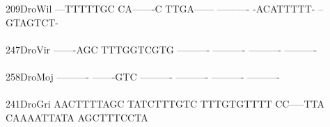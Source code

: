 \documentclass[11pt,twoside,reqno,a4paper]{article}
\begin{document}
{209\hspace*{1\charwidth}DroWil	---TTTTTGC	CA-------C	TTGA------	----------	-ACATTTTT-	--GTAGTCT-	\\
\hspace*{4\charwidth}\hspace*{7\charwidth}\hspace*{1\charwidth}\hspace*{1\charwidth}\hspace*{1\charwidth}\hspace*{1\charwidth}\hspace*{1\charwidth}\hspace*{1\charwidth}\\
247\hspace*{1\charwidth}DroVir	-------AGC	TTTGGTCGTG	----------	----------	----------	----------	\\
\hspace*{4\charwidth}\hspace*{7\charwidth}\hspace*{1\charwidth}\hspace*{1\charwidth}\hspace*{1\charwidth}\hspace*{1\charwidth}\hspace*{1\charwidth}\hspace*{1\charwidth}\\
258\hspace*{1\charwidth}DroMoj	----------	-------GTC	----------	----------	----------	----------	\\
\hspace*{4\charwidth}\hspace*{7\charwidth}\hspace*{1\charwidth}\hspace*{1\charwidth}\hspace*{1\charwidth}\hspace*{1\charwidth}\hspace*{1\charwidth}\hspace*{1\charwidth}\\
241\hspace*{1\charwidth}DroGri	AACTTTTAGC	TATCTTTGTC	TTTGTGTTTT	CC-----TTA	CAAAATTATA	AGCTTTCCTA	\\
\hspace*{4\charwidth}\hspace*{7\charwidth}\hspace*{1\charwidth}\hspace*{1\charwidth}\hspace*{1\charwidth}\hspace*{1\charwidth}\hspace*{1\charwidth}\hspace*{1\charwidth}\\
}
\end{document}
